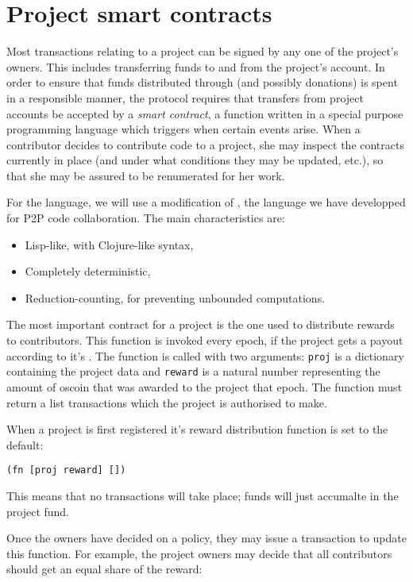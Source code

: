 \section{Project smart contracts}

Most transactions relating to a project can be signed by any one of the
project's owners. This includes transferring funds to and from the project's
account. In order to ensure that funds distributed through \osrank{} (and
possibly donations) is spent in a responsible manner, the protocol requires that
transfers from project accounts be accepted by a \emph{smart contract}, a
function written in a special purpose programming language which triggers when
certain events arise. When a contributor decides to contribute code to a
project, she may inspect the contracts currently in place (and under what
conditions they may be updated, etc.), so that she may be assured to be
renumerated for her work.
 
For the language, we will use a modification of \radicle{}, the language we have
developped for P2P code collaboration. The main characteristics are:
\begin{itemize}
\item Lisp-like, with Clojure-like syntax,
\item Completely deterministic,
\item Reduction-counting, for preventing unbounded computations.
\end{itemize}

The most important contract for a project is the one used to distribute rewards
to contributors. This function is invoked every epoch, if the project gets a
payout according to it's \osrank{}. The function is called with two arguments:
\texttt{proj} is a dictionary containing the project data and \texttt{reward} is
a natural number representing the amount of oscoin that was awarded to the
project that epoch. The function must return a list transactions which the
project is authorised to make.

When a project is first registered it's reward distribution function is set to
the default:

\begin{lstlisting}
(fn [proj reward] [])
\end{lstlisting}

This means that no transactions will take place; funds will just accumalte in
the project fund.

Once the owners have decided on a policy, they may issue a transaction to update
this function. For example, the project owners may decide that all contributors
should get an equal share of the reward:

